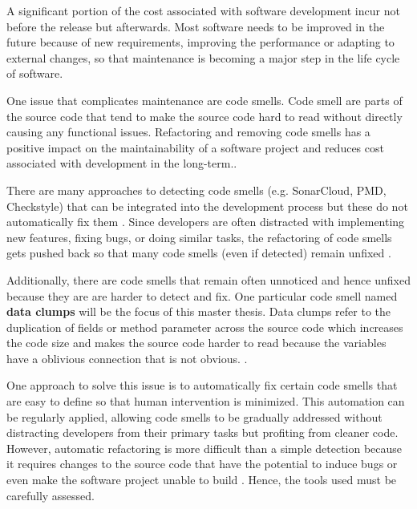 \label{sec:introduction}

A significant portion of the cost associated with software development incur not before the release but afterwards. Most software needs to be improved in the future because of new requirements, improving the performance or adapting to external changes, so that maintenance is becoming a major step in the life cycle of software. 


One issue that complicates maintenance are code smells. Code smell are parts of the source code that tend to make the source code hard to read without directly causing any functional issues. Refactoring and removing code smells has a positive impact on the maintainability  of a software project and reduces cost associated with development in the long-term.\cite{mealyEvaluatingSoftwareRefactoring2006}.



There are many approaches to detecting code smells (e.g. SonarCloud,  PMD, Checkstyle) that can be integrated into the development process but these do not automatically fix them  \cite{vidalApproachPrioritizeCode2016}. Since developers are often distracted with implementing new features, fixing bugs, or doing similar tasks, the refactoring of code smells gets pushed back so that many code smells (even if detected) remain unfixed   \cite{10.1145/2393596.2393655}.

Additionally, there are code smells that remain often unnoticed and hence unfixed because they are are harder to detect and fix. One particular code smell named \textbf{data clumps} will be the focus of this master thesis. Data clumps refer to the duplication of fields or method parameter across the source code which increases the code size and makes the source code harder to read because the variables have a oblivious connection that is not obvious.  \cite{BaumgartnerAP23}  \cite{data_clumps_refactoring_guru} \cite{join_data_items}.
 



One approach to solve this issue is to automatically fix certain code smells that are easy to define so that human intervention is minimized. This automation can be regularly applied, allowing code smells to be gradually addressed without distracting developers from their primary tasks but profiting from cleaner code. 
However,  automatic refactoring  is more difficult than a simple detection because it requires changes to the source code that have the potential to induce bugs or even make the software project unable to build \cite{9796303}. Hence, the tools used must be carefully assessed. 

